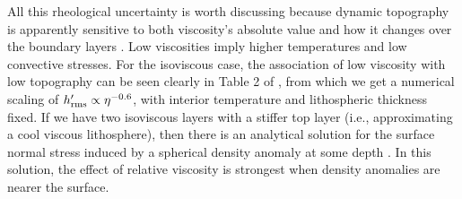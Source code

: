 \documentclass[trackchanges]{aastex63}
\newcommand{\todo}[1]{\textit{\textcolor{violet}{{#1}}}}
\newcommand{\jr}[1]{\textit{\textcolor{blue}{{#1}}}}
\begin{document}
All this rheological uncertainty is worth discussing because dynamic topography is apparently sensitive to both viscosity's absolute value and how it changes over the boundary layers \citep{hager_long-wavelength_1989}. Low viscosities imply higher temperatures and low convective stresses. For the isoviscous case, the association of low viscosity with low topography can be seen clearly in Table 2 of \citet{lees_gravity_2020}, from which we get a numerical scaling of $h_{\rm rms}^\prime \propto \eta^{-0.6}$, with interior temperature and lithospheric thickness fixed. If we have two isoviscous layers with a stiffer top layer (i.e., approximating a cool viscous lithosphere), then there is an analytical solution for the surface normal stress induced by a spherical density anomaly at some depth \citep[equation (34) in][]{morgan_gravity_1965}. In this solution, the effect of relative viscosity is strongest when density anomalies are nearer the surface.









\end{document}
